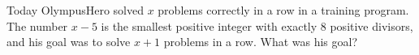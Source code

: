 Today OlympusHero solved $x$ problems correctly in a row in a training program. The number $x-5$ is the smallest positive integer with exactly $8$ positive divisors, and his goal was to solve $x+1$ problems in a row. What was his goal?
